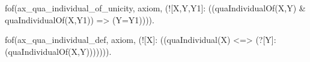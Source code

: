 fof(ax_qua_individual_of_unicity, axiom, (![X,Y,Y1]: ((quaIndividualOf(X,Y) & quaIndividualOf(X,Y1)) => (Y=Y1)))).


fof(ax_qua_individual_def, axiom, (![X]: ((quaIndividual(X) <=> (?[Y]: (quaIndividualOf(X,Y))))))).


















